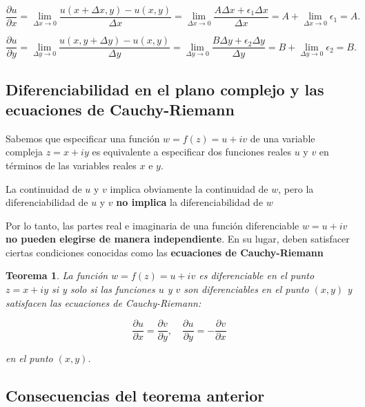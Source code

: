 \documentclass[10pt,a4paper]{book}
\newtheorem{theorem}{Teorema}[section]
\begin{document}
\begin{equation}
    \frac{\partial u}{\partial x} = \lim_{\Delta x \to 0} \frac{u(x + \Delta x, y) - u(x, y)}{\Delta x} = \lim_{\Delta x \to 0} \frac{A \Delta x + \epsilon_1 \Delta x}{\Delta x} = A + \lim_{\Delta x \to 0} \epsilon_1 = A.
\end{equation}

\begin{equation}
    \frac{\partial u}{\partial y} = \lim_{\Delta y \to 0} \frac{u(x, y + \Delta y) - u(x, y)}{\Delta y} = \lim_{\Delta y \to 0} \frac{B \Delta y + \epsilon_2 \Delta y}{\Delta y} = B + \lim_{\Delta y \to 0} \epsilon_2 = B.
\end{equation}

\subsection{Diferenciabilidad en el plano complejo y las ecuaciones de Cauchy-Riemann}

Sabemos que especificar una funci\'on $ w = f(z) = u + iv $ de una variable compleja $ z = x + iy $ es equivalente a especificar dos funciones reales $ u $ y $ v $ en t\'erminos de las variables reales $ x $ e $ y $.  

La continuidad de $ u $ y $ v $ implica obviamente la continuidad de $ w $, pero la diferenciabilidad de $ u $ y $ v $ \textbf{no implica} la diferenciabilidad de $ w $

Por lo tanto, las partes real e imaginaria de una funci\'on diferenciable $ w = u + iv $ \textbf{no pueden elegirse de manera independiente}. En su lugar, deben satisfacer ciertas condiciones conocidas como las \textbf{ecuaciones de Cauchy-Riemann}

\begin{theorem}
    La funci\'on $ w = f(z) = u + iv $ es diferenciable en el punto $ z = x + iy $ si y solo si las funciones $ u $ y $ v $ son diferenciables en el punto $ (x, y) $ y satisfacen las ecuaciones de Cauchy-Riemann:
    
    \begin{equation}
        \frac{\partial u}{\partial x} = \frac{\partial v}{\partial y}, \quad \frac{\partial u}{\partial y} = -\frac{\partial v}{\partial x}
    \end{equation}
    
    en el punto $ (x, y) $.
\end{theorem}

\subsection{Consecuencias del teorema anterior}
\end{document}
